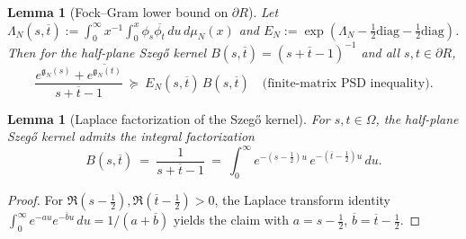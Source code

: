 \documentclass[11pt]{article}
\newtheorem{lemma}[theorem]{Lemma}
\theoremstyle{remark}
\begin{document}
\begin{lemma}[Fock–Gram lower bound on \(\partial R\)]\label{lem:fock-gram-formal}
Let \(\Lambda_N(s,\overline t):=\int_0^\infty x^{-1}\int_0^x \phi_s\overline{\phi_t}\,du\,d\mu_N(x)\) and \(E_N:=\exp(\Lambda_N-\tfrac12\mathrm{diag}-\tfrac12\mathrm{diag})\). Then for the half-plane Szeg\H{o} kernel \(B(s,\overline t)=(s+\overline t-1)^{-1}\) and all \(s,t\in\partial R\),
\[\frac{e^{\mathfrak g_N(s)}+\overline{e^{\mathfrak g_N(t)}}}{s+\overline t-1}\ \succeq\ E_N(s,\overline t)\,B(s,\overline t)\quad\text{(finite-matrix PSD inequality).}\]
\end{lemma}

\begin{lemma}[Laplace factorization of the Szeg\H{o} kernel]\label{lem:laplace-szego}
For \(s,t\in\Omega\), the half-plane Szeg\H{o} kernel admits the integral factorization
\[
 B(s,\overline t)\ =\ \frac{1}{s+\overline t-1}\ =\ \int_{0}^{\infty} e^{-(s-\tfrac12)u}\,e^{-(\overline t-\tfrac12)u}\,du.
\]
\end{lemma}
\begin{proof}
For \(\Re(s-\tfrac12),\Re(\overline t-\tfrac12)>0\), the Laplace transform identity \(\int_0^\infty e^{-au}e^{-\overline bu}\,du=1/(a+\overline b)\) yields the claim with \(a=s-\tfrac12\), \(\overline b=\overline t-\tfrac12\).
\end{proof}
\end{document}
